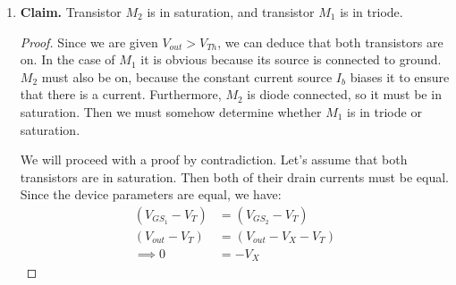 \documentclass[12pt, fleqn]{article}
\begin{document}
\begin{enumerate}[label=(\alph*)]
    \item
    {
        \textbf{Claim. } Transistor $M_2$ is in saturation, and transistor $M_1$ is in triode.
        \begin{proof}
            Since we are given $V_{out} > V_{Th}$, we can deduce that both transistors are on.  In the case of $M_1$ it is obvious because its source is connected to ground.  $M_2$ must also be on, because the constant current source $I_b$ biases it to ensure that there is a current.  Furthermore, $M_2$ is diode connected, so it must be in saturation.  Then we must somehow determine whether $M_1$ is in triode or saturation.
            
            We will proceed with a proof by contradiction.  Let's assume that both transistors are in saturation.  Then both of their drain currents must be equal.  Since the device parameters are equal, we have:
            \begin{align*}
                (V_{{GS}_1} - V_T) &= (V_{{GS}_2} - V_T)\\[0.25cm]
                (V_{out} - V_T) &= (V_{out} - V_X - V_T)\\[0.25cm]
                \implies 0 &= -V_X
            \end{align*}
            

\end{proof}}
\end{enumerate}
\end{document}
